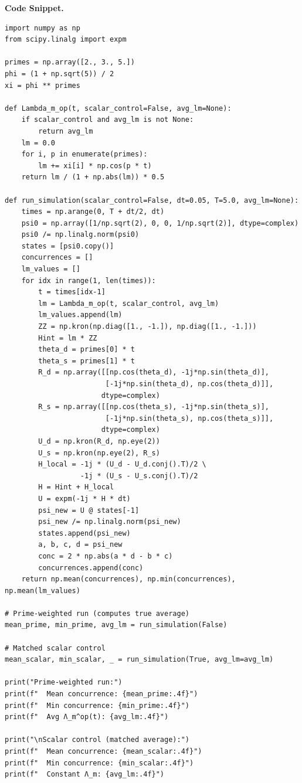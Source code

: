 \documentclass[11pt]{article}
\begin{document}
\medskip
\noindent\textbf{Code Snippet.}
\begin{verbatim}
import numpy as np
from scipy.linalg import expm

primes = np.array([2., 3., 5.])
phi = (1 + np.sqrt(5)) / 2
xi = phi ** primes

def Lambda_m_op(t, scalar_control=False, avg_lm=None):
    if scalar_control and avg_lm is not None:
        return avg_lm
    lm = 0.0
    for i, p in enumerate(primes):
        lm += xi[i] * np.cos(p * t)
    return lm / (1 + np.abs(lm)) * 0.5

def run_simulation(scalar_control=False, dt=0.05, T=5.0, avg_lm=None):
    times = np.arange(0, T + dt/2, dt)
    psi0 = np.array([1/np.sqrt(2), 0, 0, 1/np.sqrt(2)], dtype=complex)
    psi0 /= np.linalg.norm(psi0)
    states = [psi0.copy()]
    concurrences = []
    lm_values = []
    for idx in range(1, len(times)):
        t = times[idx-1]
        lm = Lambda_m_op(t, scalar_control, avg_lm)
        lm_values.append(lm)
        ZZ = np.kron(np.diag([1., -1.]), np.diag([1., -1.]))
        Hint = lm * ZZ
        theta_d = primes[0] * t
        theta_s = primes[1] * t
        R_d = np.array([[np.cos(theta_d), -1j*np.sin(theta_d)],
                        [-1j*np.sin(theta_d), np.cos(theta_d)]],
                       dtype=complex)
        R_s = np.array([[np.cos(theta_s), -1j*np.sin(theta_s)],
                        [-1j*np.sin(theta_s), np.cos(theta_s)]],
                       dtype=complex)
        U_d = np.kron(R_d, np.eye(2))
        U_s = np.kron(np.eye(2), R_s)
        H_local = -1j * (U_d - U_d.conj().T)/2 \
                  -1j * (U_s - U_s.conj().T)/2
        H = Hint + H_local
        U = expm(-1j * H * dt)
        psi_new = U @ states[-1]
        psi_new /= np.linalg.norm(psi_new)
        states.append(psi_new)
        a, b, c, d = psi_new
        conc = 2 * np.abs(a * d - b * c)
        concurrences.append(conc)
    return np.mean(concurrences), np.min(concurrences), np.mean(lm_values)

# Prime-weighted run (computes true average)
mean_prime, min_prime, avg_lm = run_simulation(False)

# Matched scalar control
mean_scalar, min_scalar, _ = run_simulation(True, avg_lm=avg_lm)

print("Prime-weighted run:")
print(f"  Mean concurrence: {mean_prime:.4f}")
print(f"  Min concurrence: {min_prime:.4f}")
print(f"  Avg Λ_m^op(t): {avg_lm:.4f}")

print("\nScalar control (matched average):")
print(f"  Mean concurrence: {mean_scalar:.4f}")
print(f"  Min concurrence: {min_scalar:.4f}")
print(f"  Constant Λ_m: {avg_lm:.4f}")
\end{verbatim}
\end{document}

